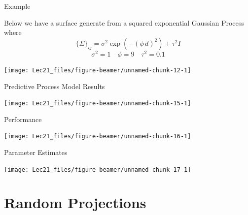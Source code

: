 \documentclass[11pt,ignorenonframetext,]{beamer}
\begin{document}
\begin{frame}{Example}
\protect\hypertarget{example-1}{}

Below we have a surface generate from a squared exponential Gaussian
Process where
\[ \{\Sigma\}_{ij} = \sigma^2 \exp\left(-(\phi\,d)^2\right) + \tau^2 I \]
\[ \sigma^2 = 1 \quad \phi=9 \quad \tau^2 = 0.1 \]

\begin{center}\texttt{[image: Lec21\_files/figure-beamer/unnamed-chunk-12-1]} \end{center}

\end{frame}

\begin{frame}{Predictive Process Model Results}
\protect\hypertarget{predictive-process-model-results}{}

\begin{center}\texttt{[image: Lec21\_files/figure-beamer/unnamed-chunk-15-1]} \end{center}

\end{frame}

\begin{frame}{Performance}
\protect\hypertarget{performance}{}

\begin{center}\texttt{[image: Lec21\_files/figure-beamer/unnamed-chunk-16-1]} \end{center}

\end{frame}

\begin{frame}{Parameter Estimates}
\protect\hypertarget{parameter-estimates}{}

\begin{center}\texttt{[image: Lec21\_files/figure-beamer/unnamed-chunk-17-1]} \end{center}

\end{frame}

\hypertarget{random-projections}{%
\section{Random Projections}\label{random-projections}}
\end{document}
